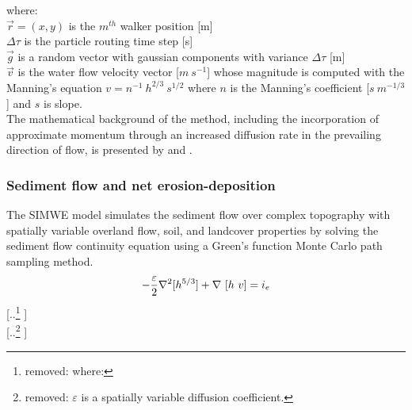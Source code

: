 \documentclass[gmd, manuscript]{copernicus}
\providecommand{\DIFadd}[1]{{\protect\color{blue} \sf #1}} %
\providecommand{\DIFdel}[1]{{\protect\color{red} [..\footnote{removed: #1} ]}} %
\providecommand{\DIFaddend}{} %
\providecommand{\DIFdelbegin}{} %
\begin{document}
{\small
\noindent
where: \\
\noindent
\hspace*{0.5em} $\vec{r} = (x, y)$ is the $m^{th}$ walker position [\unit{m}]\\
\hspace*{0.5em} $\Delta \tau$ is the particle routing time step [\unit{s}]\\
\hspace*{0.5em} $\vec{g}$ is a random vector with gaussian components with variance $\Delta \tau$ [\unit{m}]\\
\hspace*{0.5em} $\vec{v} $ is the water flow velocity vector [$\unit{m~s^{-1}}$]
whose magnitude is computed with the Manning's equation $v=n^{-1}~h^{2/3}~s^{1/2}$ 
where $n$ is the Manning's coefficient [$\unit{s~m^{-1/3}}$] and $s$ is slope.\\ 
}
\noindent
\DIFadd{The mathematical background of the method,
including the incorporation of approximate momentum 
through an increased diffusion rate in the prevailing direction of flow,
is presented by \cite{Mitas1998} and \cite{Mitasova2004}.
}


\subsubsection{\DIFadd{Sediment flow and net erosion-deposition}}

\DIFadd{The SIMWE model simulates the sediment flow over complex topography 
with spatially variable overland flow, soil, and landcover properties 
by solving  the sediment flow continuity equation
}\DIFaddend using a Green's function Monte Carlo path sampling method.
\DIFdelbegin \begin{displaymath}
-{\varepsilon\over 2 }\nabla^2 [h^{5/3}]
+\nabla ~ [ h~v] = i_e
\end{displaymath}
{\DIFdel{\small
\noindent
 where: }\\
 \DIFdel{\noindent
 \hspace*{0.5em} $\varepsilon$ is a spatially variable diffusion coefficient. }\\
}

\end{document}

